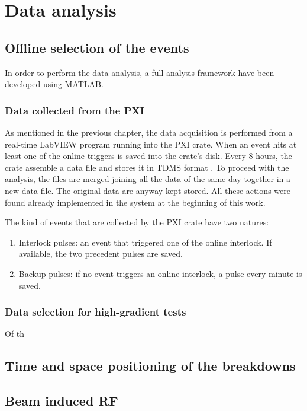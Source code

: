 \chapter[Data analysis]{Data analysis}

\section[Offline selection of the events]{Offline selection of the events}

In order to perform the data analysis, a full analysis framework have been developed using MATLAB. 

\subsection[Data collected from the PXI]{Data collected from the PXI}

As mentioned in the previous chapter, the data acquisition is performed from a real-time LabVIEW program running into the PXI crate. When an event hits at least one of the online triggers is saved into the crate's disk. Every 8 hours, the crate assemble a data file and stores it in TDMS format \cite{NI:TDMS}. To proceed with the analysis, the files are merged joining all the data of the same day together in a new data file. The original data are anyway kept stored. All these actions were found already implemented in the system at the beginning of this work.

The kind of events that are collected by the PXI crate have two natures:
\begin{enumerate}
\item Interlock pulses: an event that triggered one of the online interlock. If available, the two precedent pulses are saved.
\item Backup pulses: if no event triggers an online interlock, a pulse every minute is saved.
\end{enumerate}


\subsection[Data selection for high-gradient tests]{Data selection for high-gradient tests}

Of th





\section[Time and space positioning of the breakdowns]{Time and space positioning of the breakdowns}







\section[Beam induced RF]{Beam induced RF}
